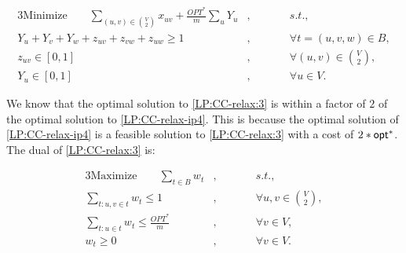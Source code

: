\begin{alignat}{3} \label{LP:CC-relax:3}
		\text{Minimize} \qquad \sum_{(u,v) \in \binom{V}{2}} x_{uv} + \frac{OPT^*}{m} \sum_u Y_u &, \qquad &&s.t., \nonumber\\
		Y_u + Y_v + Y_w + z_{uv} + z_{vw} + z_{uw} \ge 1 &, \qquad &&\forall t = (u,v,w) \in B, \nonumber\\
		z_{uv} \in [ 0,1 ]&, \qquad &&\forall (u,v) \in \binom{V}{2}, \nonumber\\
		Y_u \in [0,1] &,\qquad  &&\forall u \in V. \tag{LP6}
\end{alignat}

\noindent We know that the optimal solution to \ref{LP:CC-relax:3} is within a factor of $2$ of the optimal solution to \ref{LP:CC-relax-ip4}. This is because the optimal solution of \ref{LP:CC-relax-ip4} is a feasible solution to \ref{LP:CC-relax:3} with a cost of $2*\mathsf{opt}^*$. The dual of \ref{LP:CC-relax:3} is:

\begin{alignat}{3} 
		\text{Maximize} \qquad \sum_{t \in B} w_t &, \qquad&&s.t., \label{LP:CC-relax-dual:3} \tag{LP7}\\
		\sum_{t : u,v \in t} w_t \le 1 &, \qquad&&\forall u,v \in \binom{V}{2}, \label{eq:d04}\\
		\sum_{t : u \in t} w_t \le \frac{OPT^*}{m}&, \qquad&&\forall v \in V, \label{eq:d05}\\
		w_t \ge 0&, \qquad &&\forall v \in V. \nonumber
\end{alignat}


